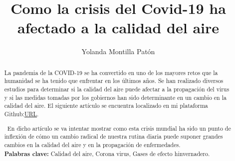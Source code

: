 \documentclass[a4paper,11pt]{article}
\begin{document}
\title{Como la crisis del Covid-19 ha afectado a la calidad del aire}
\author{Yolanda Montilla Patón}
\maketitle


\begin{abstract}
 La pandemia de la COVID-19 se ha convertido en uno de los mayores retos que la humanidad se ha tenido que enfrentar en los últimos años. Se han realizado diversos estudios para determinar si la calidad del aire puede afectar a la propagación del virus y si las medidas tomadas por los gobiernos han sido determinante en un cambio en la calidad del aire. El siguiente artículo se encuentra localizado en mi plataforma Github:\href{https://github.com/yolandaMontilla/PROYECTO_FINAL.git}{URL}.

\ En dicho artículo se va intentar mostrar como esta crisis mundial ha sido un punto de inflexión de cómo un cambio radical de nuestra rutina diaria puede suponer grandes cambios en la calidad del aire y en la propagación de enfermedades.
\textbf{\\ Palabras clave:}
Calidad del aire, Corona virus, Gases de efecto hinvernadero.

\end{abstract}
\newpage
\end{document}
